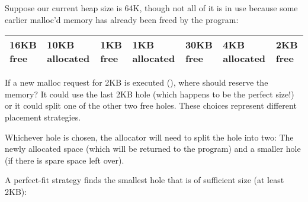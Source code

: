 Suppose our current heap size is 64K, though not all of it is in use because some earlier malloc'd memory has already been freed by the program:

\begin{longtable}[c]{@{}lllllll@{}}
\toprule
\begin{minipage}[b]{0.04\columnwidth}\raggedright\strut
16KB free
\strut\end{minipage} & \begin{minipage}[b]{0.04\columnwidth}\raggedright\strut
10KB allocated
\strut\end{minipage} & \begin{minipage}[b]{0.04\columnwidth}\raggedright\strut
1KB free
\strut\end{minipage} & \begin{minipage}[b]{0.04\columnwidth}\raggedright\strut
1KB allocated
\strut\end{minipage} & \begin{minipage}[b]{0.04\columnwidth}\raggedright\strut
30KB free
\strut\end{minipage} & \begin{minipage}[b]{0.04\columnwidth}\raggedright\strut
4KB allocated
\strut\end{minipage} & \begin{minipage}[b]{0.04\columnwidth}\raggedright\strut
2KB free
\strut\end{minipage}\tabularnewline
\midrule
\endhead
\bottomrule
\end{longtable}

If a new malloc request for 2KB is executed (), where should  reserve the memory? It could use the last 2KB hole (which happens to be the perfect size!) or it could split one of the other two free holes. These choices represent different placement strategies.

Whichever hole is chosen, the allocator will need to split the hole into two: The newly allocated space (which will be returned to the program) and a smaller hole (if there is spare space left over).

A perfect-fit strategy finds the smallest hole that is of sufficient size (at least 2KB):

